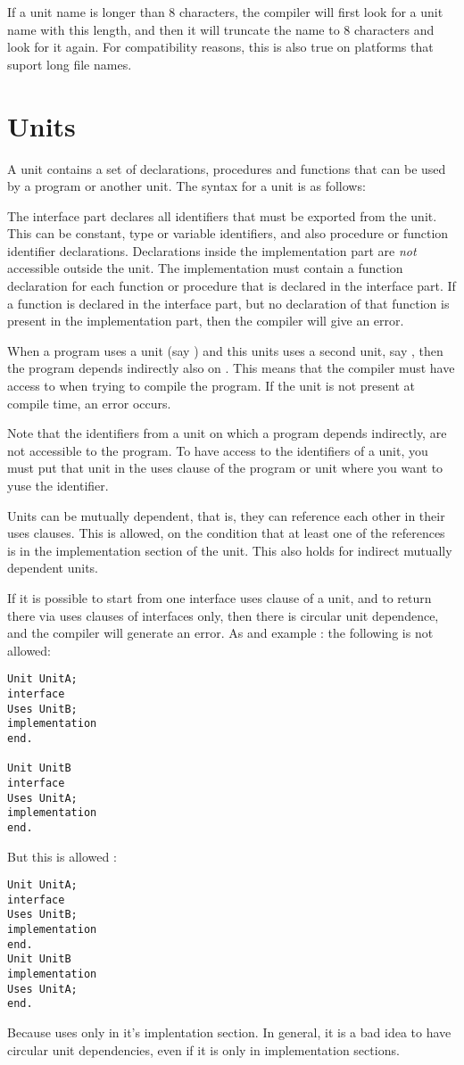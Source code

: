 \documentclass{report}
\begin{document}
If a unit name is longer than 8 characters, the compiler will first look for
a unit name with this length, and then it will truncate the name to 8
characters and look for it again. For compatibility reasons, this is also 
true on platforms that suport long file names.

\section{Units}
A unit contains a set of declarations, procedures and functions that can be
used by a program or another unit.
The syntax for a unit is as follows:

The interface part declares all identifiers that must be exported from the
unit. This can be constant, type or variable identifiers, and also procedure
or function identifier declarations. Declarations inside the
implementation part are {\em not} accessible outside the unit. The
implementation must contain a function declaration for each function or
procedure that is declared in the interface part. If a function is declared
in the interface part, but no declaration of that function is present in the
implementation part, then the compiler will give an error.

When a program uses a unit (say ) and this units uses a second
unit, say , then the program depends indirectly also on
. This means that the compiler must have access to  when
trying to compile the program. If the unit is not present at compile time,
an error occurs.

Note that the identifiers from a unit on which a program depends indirectly,
are not accessible to the program. To have access to the identifiers of a
unit, you must put that unit in the uses clause of the program or unit where
you want to yuse the identifier.

Units can be mutually dependent, that is, they can reference each other in
their uses clauses. This is allowed, on the condition that at least one of
the references is in the implementation section of the unit. This also holds
for indirect mutually dependent units.

If it is possible to start from one interface uses clause of a unit, and to return
there via uses clauses of interfaces only, then there is circular unit
dependence, and the compiler will generate an error.
As and example : the following is not allowed:
\begin{verbatim}
Unit UnitA;
interface
Uses UnitB;
implementation
end.

Unit UnitB
interface
Uses UnitA;
implementation
end.
\end{verbatim}
But this is allowed :
\begin{verbatim}
Unit UnitA;
interface
Uses UnitB;
implementation
end.
Unit UnitB
implementation
Uses UnitA;
end.
\end{verbatim}
Because  uses  only in it's implentation section.
In general, it is a bad idea to have circular unit dependencies, even if it is
only in implementation sections.
\end{document}
